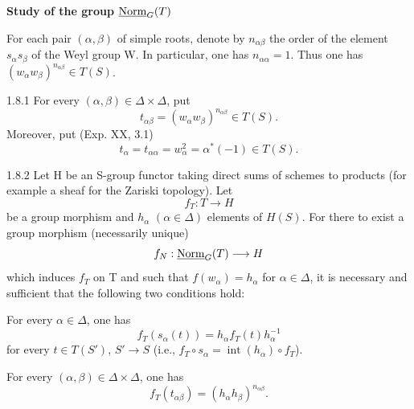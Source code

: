 \textbf{Study of the group $\underline{\mathrm{Norm}}_G(T)$}

For each pair $(\alpha,\beta)$ of simple roots, denote by $n_{\alpha\beta}$ the order of the element $s_\alpha s_\beta$ of the Weyl group W. In particular, one has $n_{\alpha\alpha}=1$. Thus one has $(w_\alpha w_\beta)^{n_{\alpha\beta}}\in T(S)$.
\begin{definition}{1.8.1}\label{XXIII.1.8.1}
For every $(\alpha,\beta)\in\Delta\times\Delta$, put
\[
t_{\alpha\beta}=(w_\alpha w_\beta)^{n_{\alpha\beta}}\in T(S).
\]
Moreover, put (Exp. XX, 3.1)
\[
t_\alpha=t_{\alpha\alpha}=w_\alpha^2=\alpha^*(-1)\in T(S).
\]
\end{definition}
\begin{proposition}{1.8.2}\label{XXIII.1.8.2}
Let H be an S-group functor taking direct sums of schemes to products (for example a sheaf for the Zariski topology). Let
\[
f_T:T\to H
\]
be a group morphism and $h_\alpha$ $(\alpha\in\Delta)$ elements of $H(S)$. For there to exist a group morphism (necessarily unique)
\[
f_N:\underline{\mathrm{Norm}}_G(T)\longrightarrow H
\]
which induces $f_T$ on T and such that $f(w_\alpha)=h_\alpha$ for $\alpha\in\Delta$, it is necessary and sufficient that the following two conditions hold:
\begin{enumeratei}
\item For every $\alpha\in\Delta$, one has
\[
f_T(s_\alpha(t))=h_\alpha f_T(t)h_\alpha^{-1}
\]
for every $t\in T(S')$, $S'\to S$ (i.e., $f_T\circ s_\alpha=\operatorname{int}(h_\alpha)\circ f_T$).
\item For every $(\alpha,\beta)\in\Delta\times\Delta$, one has
\[
f_T(t_{\alpha\beta})=(h_\alpha h_\beta)^{n_{\alpha\beta}}.
\]
\end{enumeratei}
\end{proposition}

